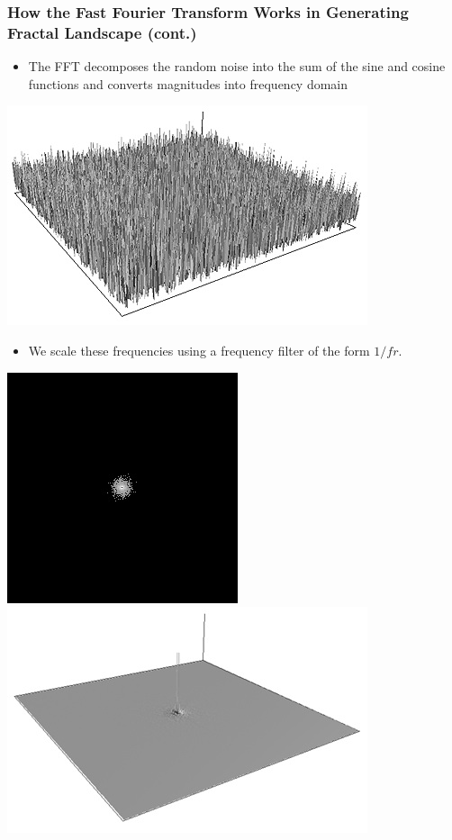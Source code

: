 \documentclass{beamer}
\begin{document}
\begin{frame}
\frametitle{How the Fast Fourier Transform Works in Generating Fractal Landscape (cont.)}
\begin{itemize}
\item The FFT decomposes the random noise into the sum of the sine and cosine functions and converts magnitudes into frequency domain
\end{itemize}
\begin{center}
\includegraphics[scale=0.17]{fft3d.jpg}
\end{center}
\begin{itemize}
\item We scale these frequencies using a frequency filter of the form $1/fr$.
\end{itemize}
\begin{center}
\includegraphics[scale=0.2]{filter2d.jpg}
\includegraphics[scale=0.2]{filter3d.jpg}
\end{center}
\end{frame}
\end{document}
